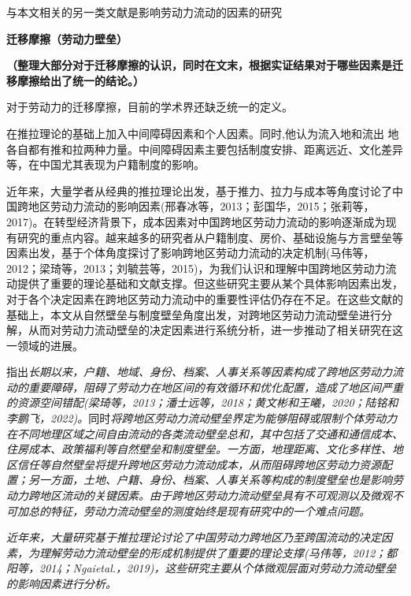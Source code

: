 \documentclass[a4paper,12pt,oneside]{book} %
\begin{document}
\cite{RenYuanNongCunWaiChuLaoDongLiHuiLiuQianYiDeYingXiangYinSuHeHuiLiuXiaoYing2017}







与本文相关的另一类文献是影响劳动力流动的因素的研究


\textbf{迁移摩擦（劳动力壁垒）}

\textbf{（整理大部分对于迁移摩擦的认识，同时在文末，根据实证结果对于哪些因素是迁移摩擦给出了统一的结论。）}

对于劳动力的迁移摩擦，目前的学术界还缺乏统一的定义。

\cite{leeTheoryMigration1966}在推拉理论的基础上加入中间障碍因素和个人因素。同时,他认为流入地和流出  地各自都有推和拉两种力量。中间障碍因素主要包括制度安排、距离远近、文化差异等，在中国尤其表现为户籍制度的影响。

近年来，大量学者从经典的推拉理论出发，基于推力、拉力与成本等角度讨论了中国跨地区劳动力流动的影响因素(邢春冰等，2013；彭国华，2015；张莉等，2017)。在转型经济背景下，成本因素对中国跨地区劳动力流动的影响逐渐成为现有研究的重点内容。越来越多的研究者从户籍制度、房价、基础设施与方言壁垒等因素出发，基于个体角度探讨了影响跨地区劳动力流动的决定机制(马伟等，2012；梁琦等，2013；刘毓芸等，2015)，为我们认识和理解中国跨地区劳动力流动提供了重要的理论基础和文献支撑。但这些研究主要从某个具体影响因素出发，对于各个决定因素在跨地区劳动力流动中的重要性评估仍存在不足。在这些文献的基础上，本文从自然壁垒与制度壁垒角度出发，对跨地区劳动力流动壁垒进行分解，从而对劳动力流动壁垒的决定因素进行系统分析，进一步推动了相关研究在这一领域的进展。

\cite{JiangWeiZhongGuoKuaDiQuLaoDongLiLiuDongBiLeiCeDuFangFaYanJinQuShiYuJueDingYinSu2024}指出\textit{长期以来，户籍、地域、身份、档案、人事关系等因素构成了跨地区劳动力流动的重要障碍，阻碍了劳动力在地区间的有效循环和优化配置，造成了地区间严重的资源空间错配(梁琦等，2013；潘士远等，2018；黄文彬和王曦，2020；陆铭和李鹏飞，2022)。}同时\textit{将跨地区劳动力流动壁垒界定为能够阻碍或限制个体劳动力在不同地理区域之间自由流动的各类流动壁垒总和，其中包括了交通和通信成本、住房成本、政策福利等自然壁垒和制度壁垒。一方面，地理距离、文化多样性、地区信任等自然壁垒将提升跨地区劳动力流动成本，从而阻碍跨地区劳动力资源配置；另一方面，土地、户籍、身份、档案、人事关系等构成的制度壁垒也是影响劳动力跨地区流动的关键因素。由于跨地区劳动力流动壁垒具有不可观测以及微观不可加总的特征，劳动力流动壁垒的测度始终是现有研究中的一个难点问题。}

\textit{近年来，大量研究基于推拉理论讨论了中国劳动力跨地区乃至跨国流动的决定因素，为理解劳动力流动壁垒的形成机制提供了重要的理论支撑(马伟等，2012；都阳等，2014；Ngaietal.，2019)，这些研究主要从个体微观层面对劳动力流动壁垒的影响因素进行分析。}
\end{document}
